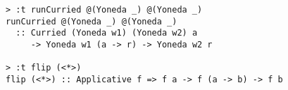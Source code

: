 \begin{repl}\begin{lstlisting}
> :t runCurried @(Yoneda _) @(Yoneda _)
runCurried @(Yoneda _) @(Yoneda _)
  :: Curried (Yoneda w1) (Yoneda w2) a
     -> Yoneda w1 (a -> r) -> Yoneda w2 r

> :t flip (<*>)
flip (<*>) :: Applicative f => f a -> f (a -> b) -> f b\end{lstlisting}\end{repl}

